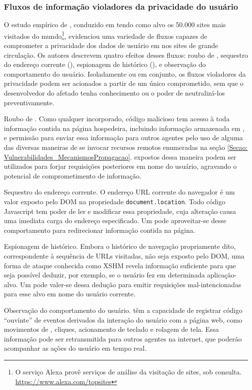 \subsubsection{Fluxos de informação violadores da privacidade do usuário}

O estudo empírico de \citeauthor{Jang2010}, conduzido em \citeyear{Jang2010} tendo como alvo os 50.000 sites mais visitados do mundo\footnote{O serviço Alexa provê serviços de análise da visitação de sites, sob consulta. \url{https://www.alexa.com/topsites}}, evidenciou uma variedade de fluxos capazes de comprometer a privacidade dos dados de usuário em nos sites  de grande circulação. Os autores descrevem quatro efeitos desses fluxos: roubo de , sequestro do endereço corrente (), espionagem de histórico (), e observação do comportamento do usuário. Isoladamente ou em conjunto, os fluxos violadores da privacidade podem ser acionados a partir de um único \script{} comprometido, sem que o desenvolvedor do  afetado tenha conhecimento ou o poder de neutralizá-los preventivamente.

\begin{alineas}
	\item Roubo de . Como qualquer \script{} incorporado, código malicioso tem acesso à toda informação contida na página hospedeira, incluindo informação armazenada em , e permissão para enviar essa informação para outros agentes pelo uso de alguma das diversas maneiras de se invocar recursos remotos enumeradas na seção \ref{Secao: Vulnerabilidades_MecanismosPropagacao}.  expostos dessa maneira podem ser utilizados para forjar requisições posteriores em nome do usuário, agravando o potencial de comprometimento de informação.
	\item Sequestro do endereço corrente. O endereço URL corrente do navegador é um valor exposto pelo DOM na propriedade \texttt{document.location}. Todo código Javascript tem poder de ler e modificar essa propriedade, cuja alteração causa uma imediata carga do endereço especificado. Um \script{} pode aproveitar-se desse comportamento para redirecionar informação contida na página.
	\item Espionagem de histórico. Embora o histórico de navegação propriamente dito, correspondente à sequência de URLs visitadas, não seja exposto pelo DOM, uma forma de ataque conhecida como XSHM  \cite{OWASP:XSHM} revela informação suficiente para que seja possível deduzir, por exemplo, se o usuário fez  em determinada aplicação-alvo. Um \script{} pode valer-se dessa dedução para emitir requisições mal-intencionadas para esse alvo em nome do usuário corrente.
	\item Observação do comportamento do usuário. \Scripts{} têm a capacidade de registrar código ``ouvinte'' de eventos derivados da interação do usuário com a página web, como movimentos de , cliques, acionamento de teclado e rolagem de tela. Essa informação pode ser retransmitida para outros agentes na internet, que poderão acompanhar as ações do usuário em tempo real.
\end{alineas}

